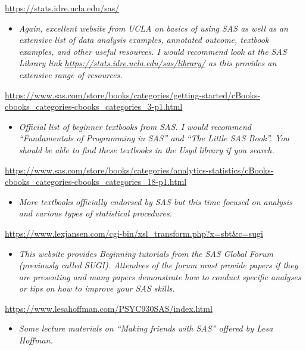 \documentclass[
]{book}
\providecommand{\tightlist}{%
  \setlength{\itemsep}{0pt}\setlength{\parskip}{0pt}}
\begin{document}
\url{https://stats.idre.ucla.edu/sas/}

\begin{itemize}
\tightlist
\item
  \emph{Again, excellent website from UCLA on basics of using SAS as well as an extensive list of data analysis examples, annotated outcome, textbook examples, and other useful resources. I would recommend look at the SAS Library link \url{https://stats.idre.ucla.edu/sas/library/} as this provides an extensive range of resources.}
\end{itemize}

\url{https://www.sas.com/store/books/categories/getting-started/cBooks-cbooks_categories-cbooks_categories_3-p1.html}

\begin{itemize}
\tightlist
\item
  \emph{Official list of beginner textbooks from SAS. I would recommend ``Fundamentals of Programming in SAS'' and ``The Little SAS Book''. You should be able to find these textbooks in the Usyd library if you search.}
\end{itemize}

\url{https://www.sas.com/store/books/categories/analytics-statistics/cBooks-cbooks_categories-cbooks_categories_18-p1.html}

\begin{itemize}
\tightlist
\item
  \emph{More textbooks officially endorsed by SAS but this time focused on analysis and various types of statistical procedures.}
\end{itemize}

\url{https://www.lexjansen.com/cgi-bin/xsl_transform.php?x=sbt\&c=sugi}

\begin{itemize}
\tightlist
\item
  \emph{This website provides Beginning tutorials from the SAS Global Forum (previously called SUGI). Attendees of the forum must provide papers if they are presenting and many papers demonstrate how to conduct specific analyses or tips on how to improve your SAS skills.}
\end{itemize}

\url{https://www.lesahoffman.com/PSYC930SAS/index.html}

\begin{itemize}
\tightlist
\item
  \emph{Some lecture materials on ``Making friends with SAS'' offered by Lesa Hoffman.}
\end{itemize}
\end{document}
